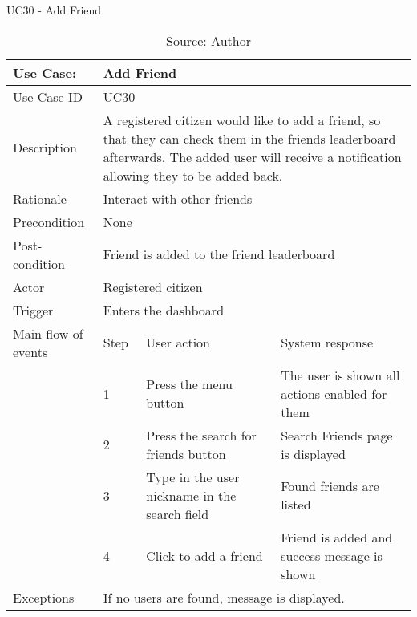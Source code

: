 \begin{table}[h]
\centering
\caption{UC30 - Add Friend}
\label{uc:30}
\begin{tabular}{|p{3cm}|p{1cm}|p{5cm}|p{5cm}|}
\hline
Use Case:       & \multicolumn{3}{p{11cm}|}{Add Friend} \\ \hline
Use Case ID     & \multicolumn{3}{p{11cm}|}{UC30} \\ \hline
Description     & \multicolumn{3}{p{11cm}|}{A registered citizen would like to add a friend, so that they can check them in the friends leaderboard afterwards. The added user will receive a notification allowing they to be added back.} \\ \hline
Rationale       & \multicolumn{3}{p{11cm}|}{Interact with other friends} \\ \hline
Precondition    & \multicolumn{3}{p{11cm}|}{None} \\ \hline
Post-condition  & \multicolumn{3}{p{11cm}|}{Friend is added to the friend leaderboard} \\ \hline
Actor           & \multicolumn{3}{p{11cm}|}{Registered citizen} \\ \hline
Trigger         & \multicolumn{3}{p{11cm}|}{Enters the dashboard} \\ \hline
Main flow of events & Step  & User action & System response \\ \hline
                    & 1     & Press the menu button & The user is shown all actions enabled for them \\ \hline
                    & 2     & Press the search for friends button & Search Friends page is displayed \\ \hline
                    & 3     & Type in the user nickname in the search field & Found friends are listed \\ \hline
                    & 4     & Click to add a friend & Friend is added and success message is shown \\ \hline
Exceptions      & \multicolumn{3}{p{11cm}|}{If no users are found, message is displayed.} \\ \hline
\end{tabular}
\caption*{Source: Author}
\end{table}

